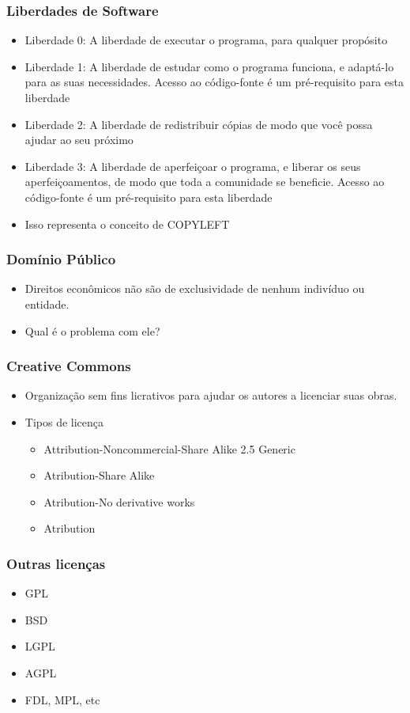 \documentclass{beamer}
\begin{document}
\frame
{
	\frametitle{Liberdades de Software}
	\begin{itemize}
		\item <1->Liberdade 0: A liberdade de executar o programa, para qualquer propósito
		\item <2->Liberdade 1: A liberdade de estudar como o programa funciona, e adaptá-lo para as suas necessidades. Acesso ao código-fonte é um pré-requisito para esta liberdade
		\item <3->Liberdade 2: A liberdade de redistribuir cópias de modo que você possa ajudar ao seu próximo
		\item <4->Liberdade 3: A liberdade de aperfeiçoar o programa, e liberar os seus aperfeiçoamentos, de modo que toda a comunidade se beneficie. Acesso ao código-fonte é um pré-requisito para esta liberdade
		\item <5->Isso representa o conceito de COPYLEFT
	\end{itemize}
}

\frame
{
	\frametitle{Domínio Público}
	\begin{itemize}
		\item Direitos econômicos não são de exclusividade de nenhum indivíduo ou entidade.
		\item Qual é o problema com ele? 
	\end{itemize}
}

\frame
{
	\frametitle{Creative Commons}
	\begin{itemize}
		\item Organização sem fins licrativos para ajudar os autores a licenciar suas obras.
		\item Tipos de licença
		\begin{itemize}
			\item Attribution-Noncommercial-Share Alike 2.5 Generic
			\item Atribution-Share Alike
			\item Atribution-No derivative works
			\item Atribution
		\end{itemize}
	\end{itemize}
}

\frame
{
	\frametitle{Outras licenças}
	\begin{itemize}
		\item GPL
		\item BSD
		\item LGPL
		\item AGPL
		\item FDL, MPL, etc
	\end{itemize}
}
\end{document}
